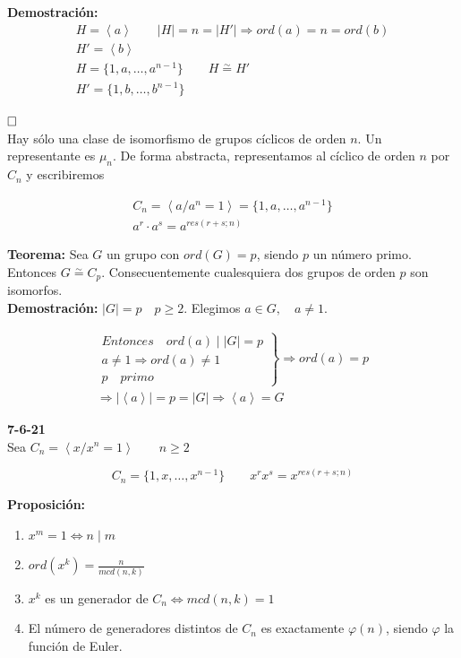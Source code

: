 \documentclass{article}
\begin{document}
\textbf{Demostración:} 
\begin{gather*}
H=\left\langle a \right\rangle \qquad |H|=n=|H'| \Rightarrow ord(a)=n=ord(b) \\
H'=\left\langle b \right\rangle \\
H=\{1,a,\ldots,a^{n-1}\} \qquad H\overset{\sim}{=} H' \\
H'=\{1,b,\ldots,b^{n-1}\}
\end{gather*}

$\hfill\square$ \\

Hay sólo una clase de isomorfismo de grupos cíclicos de orden $n$. Un representante es $\mu_n$. De forma abstracta, representamos al cíclico de orden $n$ por $C_n$ y escribiremos

\begin{gather*}
C_n=\left\langle a/a^n=1\right\rangle = \{1,a,\ldots,a^{n-1}\} \\
a^r\cdot a^s=a^{res(r+s;n)}
\end{gather*}

\textbf{Teorema:} Sea $G$ un grupo con $ord(G)=p$, siendo $p$ un número primo. Entonces $G\overset{\sim}{=}C_p$. Consecuentemente cualesquiera dos grupos de orden $p$ son isomorfos. \\

\textbf{Demostración:} $|G|=p \quad p\geq 2$. Elegimos $a \in G, \quad a \neq 1$.

\begin{gather*}
\left. \begin{array}{c}
Entonces \quad ord(a)\mid |G|=p \\
a\neq 1 \Rightarrow ord(a)\neq 1 \\
p \quad primo
\end{array} \right\rbrace \Rightarrow ord(a)=p \\
\Rightarrow |\left\langle a \right\rangle| =p=|G| \Rightarrow \left\langle a \right\rangle = G
\end{gather*}

\textbf{7-6-21} \\

Sea $C_n=\left\langle x/x^n=1\right\rangle \qquad n \geq 2$

\begin{equation*}
C_n=\{1,x,\ldots,x^{n-1}\} \qquad x^rx^s=x^{res(r+s;n)}
\end{equation*}

\textbf{Proposición:}
\begin{enumerate}[(1)]
\item $x^m=1\Leftrightarrow n\mid m$
\item $ord(x^k)=\frac{n}{mcd(n,k)}$
\item $x^k$ es un generador de $C_n \Leftrightarrow mcd(n,k)=1$
\item El número de generadores distintos de $C_n$ es exactamente $\varphi(n)$, siendo $\varphi$ la función de Euler.
\end{enumerate}
\end{document}
